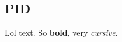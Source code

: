 \documentclass[Main]{subfiles}
\begin{document}
\subsection{PID} %
	\label{sec:pid}

	Lol text.
	So \textbf{bold}, very \emph{cursive}.

\end{document}
